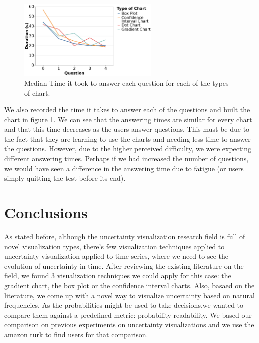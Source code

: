 \documentclass[a4paper,3p,sort&compress]{elsarticle}
\begin{document}
\begin{figure}
  \centering
   \includegraphics[width=0.6\textwidth]{duration_evo2}
  \caption{\label{figure:duration} Median Time it took to answer each question for each of the types of chart.}
\end{figure}  

We also recorded the time it takes to answer each of the questions and built the chart in figure \ref{figure:duration}. We 
can see that the answering times are similar for every chart and that this time decreases as the users answer questions.
This must be due to the fact that they are learning to use the charts and needing less time to answer the questions.
However, due to the higher perceived difficulty, we were expecting different answering times. Perhaps if we had 
increased the number of questions, we would have seen a difference in the answering time due to fatigue (or users simply quitting the test 
before its end).


\section{Conclusions}
\label{sec:concl}

As stated before, although the uncertainty visualization research field is full of novel visualization types, there's few 
visualization techniques applied to uncertainty visualization applied to time series, where we need to see the evolution of uncertainty 
in time. After reviewing the existing literature on the field, we found 3 visualization techniques we could apply for this case:
the gradient chart, the box plot or the confidence interval charts. Also, basaed on the literature, we come up with a 
novel way to visualize uncertainty based on natural frequencies.
As the probabilities might be used to take decisions,we wanted to compare them against a predefined metric: probability readability.
We based our comparison on previous experiments on uncertainty visualizations and we use the amazon turk to find 
users for that comparison.
\end{document}
